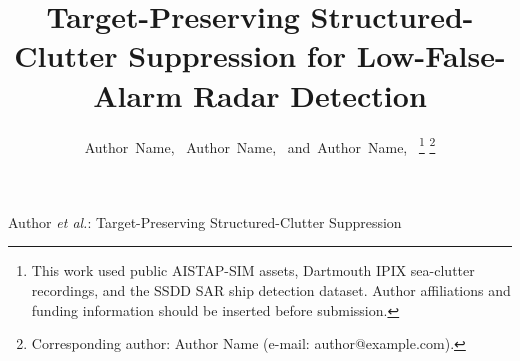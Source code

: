 \documentclass[journal]{IEEEtran}
\begin{document}
\title{Target-Preserving Structured-Clutter Suppression for Low-False-Alarm Radar Detection}

\author{Author~Name,~
        Author~Name,~
        and~Author~Name,~%
\thanks{This work used public AISTAP-SIM assets, Dartmouth IPIX sea-clutter recordings, and the SSDD SAR ship detection dataset. Author affiliations and funding information should be inserted before submission.}%
\thanks{Corresponding author: Author Name (e-mail: author@example.com).}}

%
{Author \MakeLowercase{\textit{et al.}}: Target-Preserving Structured-Clutter Suppression}

\maketitle
\end{document}
